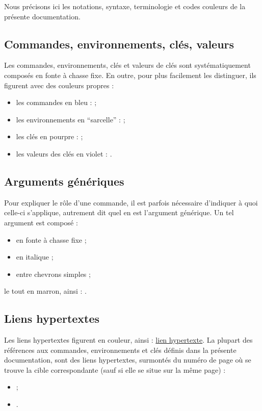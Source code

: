 \documentclass[english,nolocaltoc]{nwejmart}
\newtheorem[style=definition]{fait}
\newtheorem[title=expérience]{experience}
\newtheorem[title-plural=anneaux]{anneau}
\newtheorem[title=idéal,title-plural=idéaux]{ideal}
\begin{document}
Nous précisons ici les notations, syntaxe, terminologie et codes couleurs de
la présente documentation.

\subsection{Commandes, environnements, clés, valeurs}\label{sec-comm-envir-cles}

Les commandes, environnements, clés et valeurs de clés sont systématiquement
composés en fonte à chasse fixe. En outre, pour plus facilement les
distinguer, ils figurent avec des couleurs propres :
\begin{itemize}
\item les commandes en bleu :  ;
\item les environnements en \enquote{sarcelle} :
   ;
\item les clés en pourpre :  ;
\item les valeurs des clés en violet : .
\end{itemize}

\subsection{Arguments génériques}
\label{sec-arguments-generiques}

Pour expliquer le rôle d'une commande, il est parfois nécessaire d'indiquer
à quoi celle-ci s'applique, autrement dit quel en est l'argument générique.
Un tel argument est composé :
\begin{itemize}
\item en fonte à chasse fixe ;
\item en italique ;
\item entre chevrons simples ;
\end{itemize}
le tout en marron, ainsi : .

\subsection{Liens hypertextes}
\label{sec-liens-hypertextes}

Les liens hypertextes figurent en couleur, ainsi :
\href{http://gte.univ-littoral.fr/members/dbitouze/pub/latex}{lien hypertexte}.
La plupart des références aux commandes, environnements et clés définis dans la
présente documentation, sont des liens hypertextes, surmontés du numéro de page
où se trouve la cible correspondante (sauf si elle se situe sur la même page) :
\begin{itemize}
\item {} ;
\item {}.
\end{itemize}
\end{document}
